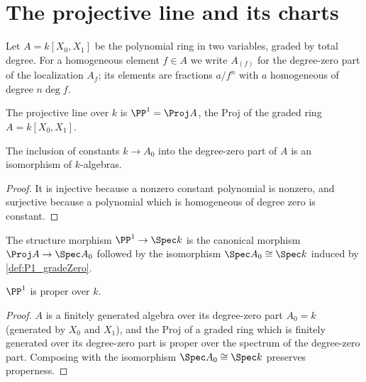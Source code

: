 \section{The projective line and its charts}

Let \(A = k[X_0, X_1]\) be the polynomial ring in two variables, graded by total degree. For a
homogeneous element \(f \in A\) we write \(A_{(f)}\) for the degree-zero part of the
localization \(A_f\); its elements are fractions \(a/f^n\) with \(a\) homogeneous of degree
\(n \deg f\).

\begin{definition}
  \label{def:P1}
  \leanok
  The projective line over \(k\) is \(\PP^1 = \Proj A\), the Proj of the graded ring
  \(A = k[X_0, X_1]\).
\end{definition}

\begin{definition}
  \label{def:P1_gradeZero}
  \leanok
  The inclusion of constants \(k \to A_0\) into the degree-zero part of \(A\) is an
  isomorphism of \(k\)-algebras.
\end{definition}
\begin{proof}
  \leanok
  It is injective because a nonzero constant polynomial is nonzero, and surjective because a
  polynomial which is homogeneous of degree zero is constant.
\end{proof}

\begin{definition}
  \label{def:P1_structureMap}
  \leanok
  The structure morphism \(\PP^1 \to \Spec k\) is the canonical morphism
  \(\Proj A \to \Spec A_0\) followed by the isomorphism \(\Spec A_0 \cong \Spec k\) induced by
  \ref{def:P1_gradeZero}.
\end{definition}

\begin{theorem}
  \label{thm:P1_proper}
  \leanok
  \(\PP^1\) is proper over \(k\).
\end{theorem}
\begin{proof}
  \leanok
  \(A\) is a finitely generated algebra over its degree-zero part \(A_0 = k\) (generated by
  \(X_0\) and \(X_1\)), and the Proj of a graded ring which is finitely generated over its
  degree-zero part is proper over the spectrum of the degree-zero part. Composing with the
  isomorphism \(\Spec A_0 \cong \Spec k\) preserves properness.
\end{proof}

